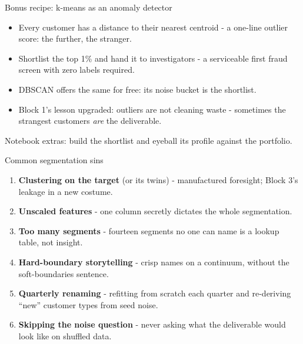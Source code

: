 \documentclass[10pt,aspectratio=169]{beamer}
\begin{document}
\begin{frame}{Bonus recipe: k-means as an anomaly detector}
  \begin{itemize}
    \item Every customer has a \alert{distance to their nearest centroid}
          - a one-line outlier score: the further, the stranger.
    \item Shortlist the top 1\% and hand it to investigators - a
          serviceable first fraud screen with zero labels required.
    \item DBSCAN offers the same for free: its \alert{noise bucket} is the
          shortlist.
    \item Block 1's lesson upgraded: outliers are not cleaning waste -
          sometimes the strangest customers \emph{are} the deliverable.
  \end{itemize}
  \vspace{0.5em}
  \begin{center}\small
    Notebook extras: build the shortlist and eyeball its profile against
    the portfolio.
  \end{center}
\end{frame}

\begin{frame}{Common segmentation sins}
  \begin{enumerate}
    \item \textbf{Clustering on the target} (or its twins) -
          manufactured foresight; Block 3's leakage in a new costume.
    \item \textbf{Unscaled features} - one column secretly dictates the
          whole segmentation.
    \item \textbf{Too many segments} - fourteen segments no one can
          name is a lookup table, not insight.
    \item \textbf{Hard-boundary storytelling} - crisp names on a
          continuum, without the soft-boundaries sentence.
    \item \textbf{Quarterly renaming} - refitting from scratch each
          quarter and re-deriving ``new'' customer types from seed noise.
    \item \textbf{Skipping the noise question} - never asking what the
          deliverable would look like on shuffled data.
  \end{enumerate}
\end{frame}
\end{document}
